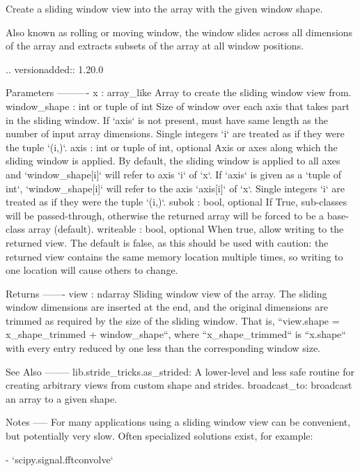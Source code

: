 \begin{DoxyVerb}Create a sliding window view into the array with the given window shape.

Also known as rolling or moving window, the window slides across all
dimensions of the array and extracts subsets of the array at all window
positions.

.. versionadded:: 1.20.0

Parameters
----------
x : array_like
    Array to create the sliding window view from.
window_shape : int or tuple of int
    Size of window over each axis that takes part in the sliding window.
    If `axis` is not present, must have same length as the number of input
    array dimensions. Single integers `i` are treated as if they were the
    tuple `(i,)`.
axis : int or tuple of int, optional
    Axis or axes along which the sliding window is applied.
    By default, the sliding window is applied to all axes and
    `window_shape[i]` will refer to axis `i` of `x`.
    If `axis` is given as a `tuple of int`, `window_shape[i]` will refer to
    the axis `axis[i]` of `x`.
    Single integers `i` are treated as if they were the tuple `(i,)`.
subok : bool, optional
    If True, sub-classes will be passed-through, otherwise the returned
    array will be forced to be a base-class array (default).
writeable : bool, optional
    When true, allow writing to the returned view. The default is false,
    as this should be used with caution: the returned view contains the
    same memory location multiple times, so writing to one location will
    cause others to change.

Returns
-------
view : ndarray
    Sliding window view of the array. The sliding window dimensions are
    inserted at the end, and the original dimensions are trimmed as
    required by the size of the sliding window.
    That is, ``view.shape = x_shape_trimmed + window_shape``, where
    ``x_shape_trimmed`` is ``x.shape`` with every entry reduced by one less
    than the corresponding window size.

See Also
--------
lib.stride_tricks.as_strided: A lower-level and less safe routine for
    creating arbitrary views from custom shape and strides.
broadcast_to: broadcast an array to a given shape.

Notes
-----
For many applications using a sliding window view can be convenient, but
potentially very slow. Often specialized solutions exist, for example:

- `scipy.signal.fftconvolve`


\end{DoxyVerb}
